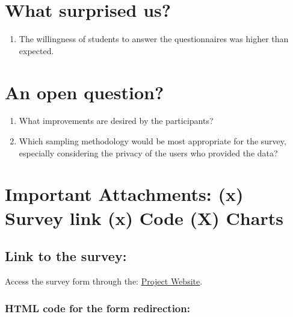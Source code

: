 \documentclass[12pt]{article}
\begin{document}
\begin{center}
\vfill
\thepage
\end{center}
\newpage

\section{What surprised us?}

\begin{enumerate}
    \item The willingness of students to answer the questionnaires was higher than expected.
\end{enumerate}



\begin{center}
\vfill
\thepage
\end{center}
\newpage

\section{An open question?}

\begin{enumerate}
    \item What improvements are desired by the participants?
    \item Which sampling methodology would be most appropriate for the survey, especially considering the privacy of the users who provided the data?
\end{enumerate}

\begin{center}
\vfill
\thepage
\end{center}
\newpage

\section{Important Attachments: (x) Survey link (x) Code (X) Charts}

\subsection{Link to the survey:}

Access the survey form through the: \href{https://est001-grupo1-ence-forms.netlify.app}{Project Website}.

\subsubsection{HTML code for the form redirection:}
\end{document}
